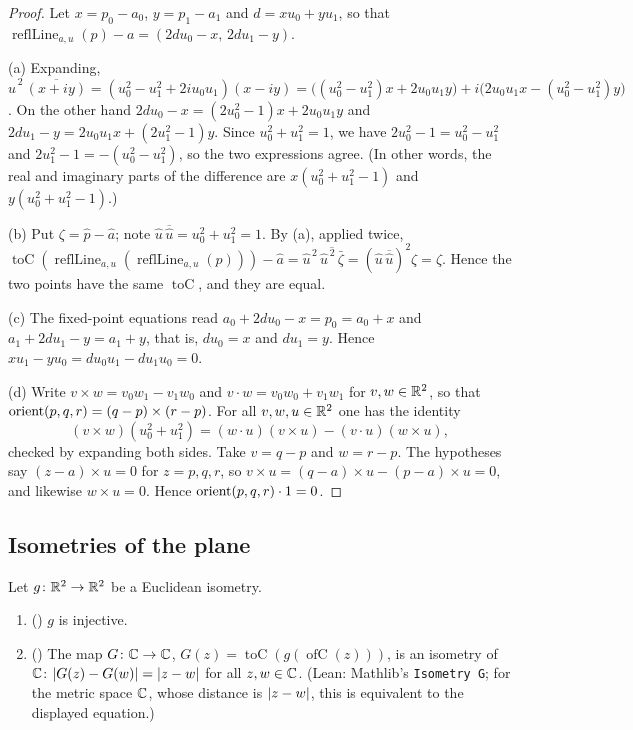 \begin{proof}
Let $x=p_0-a_0$, $y=p_1-a_1$ and $d=xu_0+yu_1$, so that $\operatorname{reflLine}_{a,u}(p)-a=(2du_0-x,\,2du_1-y)$.

(a) Expanding, $\hat u^{\,2}\,\overline{(x+iy)}=(u_0^2-u_1^2+2iu_0u_1)(x-iy)=\bigl((u_0^2-u_1^2)x+2u_0u_1y\bigr)+
i\bigl(2u_0u_1x-(u_0^2-u_1^2)y\bigr)$. On the other hand $2du_0-x=(2u_0^2-1)x+2u_0u_1y$ and
$2du_1-y=2u_0u_1x+(2u_1^2-1)y$. Since $u_0^2+u_1^2=1$, we have $2u_0^2-1=u_0^2-u_1^2$ and $2u_1^2-1=-(u_0^2-u_1^2)$, so the
two expressions agree. (In other words, the real and imaginary parts of the difference are $x(u_0^2+u_1^2-1)$ and
$y(u_0^2+u_1^2-1)$.)

(b) Put $\zeta=\hat p-\hat a$; note $\hat u\,\overline{\hat u}=u_0^2+u_1^2=1$. By (a), applied twice,
$\operatorname{toC}(\operatorname{reflLine}_{a,u}(\operatorname{reflLine}_{a,u}(p)))-\hat a=\hat u^{\,2}\,
\overline{\hat u^{\,2}\,\bar\zeta}=(\hat u\,\overline{\hat u})^2\zeta=\zeta$. Hence the two points have the same
$\operatorname{toC}$, and they are equal.

(c) The fixed-point equations read $a_0+2du_0-x=p_0=a_0+x$ and $a_1+2du_1-y=a_1+y$, that is, $du_0=x$ and $du_1=y$. Hence
$xu_1-yu_0=du_0u_1-du_1u_0=0$.

(d) Write $v\times w=v_0w_1-v_1w_0$ and $v\cdot w=v_0w_0+v_1w_1$ for $v,w\in\mathbb R^2$, so that
$\operatorname{orient}(p,q,r)=(q-p)\times(r-p)$. For all $v,w,u\in\mathbb R^2$ one has the identity
\[
  (v\times w)(u_0^2+u_1^2)=(w\cdot u)(v\times u)-(v\cdot u)(w\times u),
\]
checked by expanding both sides. Take $v=q-p$ and $w=r-p$. The hypotheses say $(z-a)\times u=0$ for $z=p,q,r$, so
$v\times u=(q-a)\times u-(p-a)\times u=0$, and likewise $w\times u=0$. Hence $\operatorname{orient}(p,q,r)\cdot1=0$.
\end{proof}

\subsection{Isometries of the plane}\label{sr:ssec:iso}

\begin{lemma}\label{sr:lem:toC-iso}
Let $g\colon\mathbb R^2\to\mathbb R^2$ be a Euclidean isometry.
\begin{enumerate}[label=(\alph*)]
\item () $g$ is injective.
\item () The map $G\colon\mathbb C\to\mathbb C$, $G(z)=\operatorname{toC}(g(\operatorname{ofC}(z)))$, is
  an isometry of $\mathbb C$:
  $\lvert G(z)-G(w)\rvert=\lvert z-w\rvert$ for all $z,w\in\mathbb C$. (Lean: Mathlib's \texttt{Isometry G}; for the metric space $\mathbb C$, whose
  distance is $\lvert z-w\rvert$, this is equivalent to the displayed equation.)
\end{enumerate}
\end{lemma}


